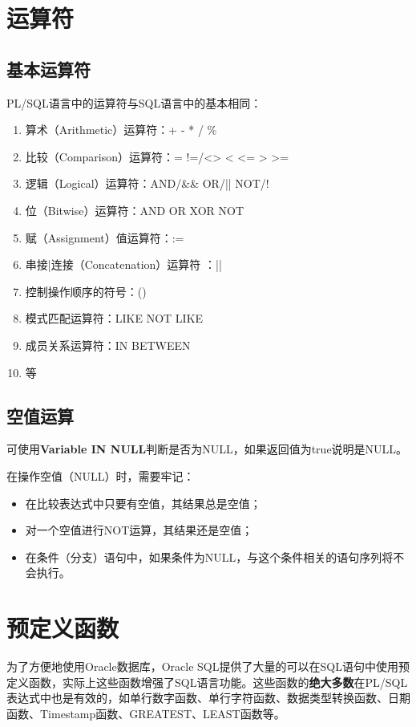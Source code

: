 \documentclass[11pt, a4paper, oneside, UTF8]{ctexbook}
\let\kaishu\relax %
\begin{document}
\chapter{运算符}

\section{基本运算符}
PL/SQL语言中的运算符与SQL语言中的基本相同：
\begin{enumerate}
  \item 算术（Arithmetic）运算符：+ - * / \%
  \item 比较（Comparison）运算符：= !=/<> < <= > >=
  \item 逻辑（Logical）运算符：AND/\&\& OR/|| NOT/!
  \item 位（Bitwise）运算符：AND OR XOR NOT
  \item 赋（Assignment）值运算符：:=
  \item 串接|连接（Concatenation）运算符 ：||
  \item 控制操作顺序的符号：()
  \item 模式匹配运算符：LIKE NOT LIKE
  \item 成员关系运算符：IN BETWEEN
  \item 等
\end{enumerate}
\section{空值运算}
可使用{\bfseries\kaishu Variable IN NULL}判断是否为NULL，如果返回值为true说明是NULL。

在操作空值（NULL）时，需要牢记：
\begin{itemize}
  \item 在比较表达式中只要有空值，其结果总是空值；
  \item 对一个空值进行NOT运算，其结果还是空值；
  \item 在条件（分支）语句中，如果条件为NULL，与这个条件相关的语句序列将不会执行。
\end{itemize}

\chapter{预定义函数}
为了方便地使用Oracle数据库，Oracle SQL提供了大量的可以在SQL语句中使用预定义函数，实际上这些函数增强了SQL语言功能。这些函数的{\bfseries\kaishu 绝大多数}在PL/SQL表达式中也是有效的，如单行数字函数、单行字符函数、数据类型转换函数、日期函数、Timestamp函数、GREATEST、LEAST函数等。
\end{document}
